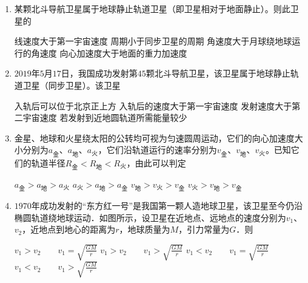 
\begin{enumerate}[leftmargin=0em]
\renewcommand{\labelenumi}{\arabic{enumi}.}
\item
{}
某颗北斗导航卫星属于地球静止轨道卫星（即卫星相对于地面静止）。则此卫星的  

\fourchoices
{线速度大于第一宇宙速度}
{周期小于同步卫星的周期}
{角速度大于月球绕地球运行的角速度}
{向心加速度大于地面的重力加速度}




\item 
{}
$ 2019 $年$ 5 $月$ 17 $日，我国成功发射第$ 45 $颗北斗导航卫星，该卫星属于地球静止轨道卫星（同步卫星）。该卫星  

\fourchoices
{入轨后可以位于北京正上方}
{入轨后的速度大于第一宇宙速度}
{发射速度大于第二宇宙速度}
{若发射到近地圆轨道所需能量较少}




\item 
{}
金星、地球和火星绕太阳的公转均可视为匀速圆周运动，它们的向心加速度大小分别为$ a_{ \text{金} } $、$ a_{ \text{地} } $、$ a_{ \text{火} } $，它们沿轨道运行的速率分别为$ v_{ \text{金} } $、$ v_{ \text{地} } $、$ v_{ \text{火} } $。已知它们的轨道半径$ R _{ \text{金} } <R _{ \text{地} } <R_{ \text{火} }$，由此可以判定  

\fourchoices
{$ a _{ \text{金} } >a _{ \text{地} } >a_{ \text{火} } $}
{$ a_{ \text{火} } >a _{ \text{地} } >a_{ \text{金} } $}
{$ v_{ \text{地} } >v_{ \text{火} } >v_{ \text{金} } $}
{$ v _{ \text{火} } >v _{ \text{地} } >v_{ \text{金} } $}




\item 
{}
$ 1970 $年成功发射的“东方红一号”是我国第一颗人造地球卫星，该卫星至今仍沿椭圆轨道绕地球运动．如图所示，设卫星在近地点、远地点的速度分别为$ v_{1} $、$ v_{2} $，近地点到地心的距离为$ r $，地球质量为$ M $，引力常量为$ G $．则  
\begin{figure}[h!]
\centering

\end{figure}
\fourchoices
{$v _ { 1 } > v _ { 2 } \qquad v _ { 1 } = \sqrt { \frac { G M } { r } }$}
{$v _ { 1 } > v _ { 2 } \qquad v _ { 1 } > \sqrt { \frac { G M } { r } }$}
{$v _ { 1 } < v _ { 2 } \qquad v _ { 1 } = \sqrt { \frac { G M } { r } }$}
{$v _ { 1 } < v _ { 2 } \qquad v _ { 1 } > \sqrt { \frac { G M } { r } }$}





\end{enumerate}
